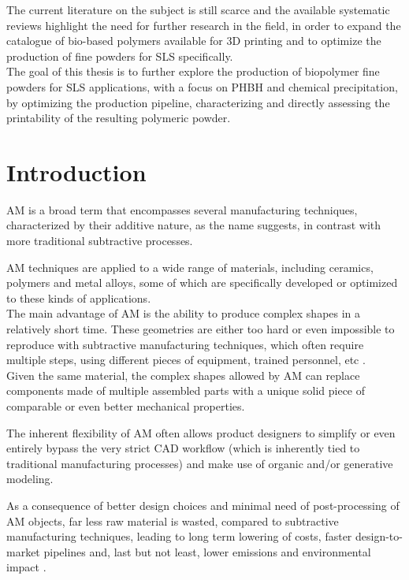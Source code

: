 \documentclass{article}
\begin{document}
    The current literature on the subject is still scarce and the available systematic reviews highlight the need for further research in the field, 
    in order to expand the catalogue of bio-based polymers available for 3D printing and to optimize the production of fine powders
    for SLS specifically. \\

    The goal of this thesis is to further explore the production of biopolymer fine powders for SLS applications, with a focus on 
    PHBH and chemical precipitation, by optimizing the production pipeline, characterizing and directly assessing 
    the printability of the resulting polymeric powder. \\  

    \clearpage
    \section{Introduction\label{Intro}}

    AM is a broad term that encompasses several manufacturing techniques, characterized by their additive nature, as the name suggests, 
    in contrast with more traditional subtractive processes.
    
    AM techniques are applied to a wide range of materials, including ceramics, polymers and metal alloys, some of which are specifically developed or optimized to 
    these kinds of applications. \\ 
    
    The main advantage of AM is the ability to produce complex shapes in a relatively short time. 
    These geometries are either too hard or even impossible to reproduce with subtractive manufacturing techniques, which often require multiple steps, using different 
    pieces of equipment, trained personnel, etc \autocites{DechetMaximilianA2020OtDo}. \\

    Given the same material, the complex shapes allowed by AM can replace components made of multiple assembled parts with a unique solid piece of comparable or even better mechanical properties. 
    
    The inherent flexibility of AM often allows product designers to simplify or even entirely bypass the very strict CAD workflow (which is inherently tied to 
    traditional manufacturing processes) and make use of organic and/or generative modeling. 

    As a consequence of better design choices and minimal need of post-processing of AM objects, far less raw material is wasted, compared to subtractive manufacturing techniques, leading to 
    long term lowering of costs, faster design-to-market pipelines and, last but not least, lower emissions and environmental impact \autocite*{Recent_progress_polymers_AM}. 
\end{document}
